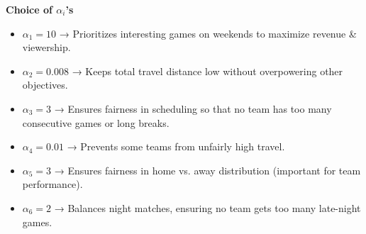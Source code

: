 \documentclass[a4paper, 12pt]{article}
\begin{document}
\vspace{15pt}
\textbf{Choice of $\alpha_i$'s}
\begin{itemize}
    \item \(\alpha_1 = 10\) → Prioritizes interesting games on weekends to maximize revenue \& viewership.
    \item \(\alpha_2 = 0.008\) → Keeps total travel distance low without overpowering other objectives.
    \item \(\alpha_3 = 3\) → Ensures fairness in scheduling so that no team has too many consecutive games or long breaks.
    \item \(\alpha_4 = 0.01\) → Prevents some teams from unfairly high travel.
    \item \(\alpha_5 = 3\) → Ensures fairness in home vs. away distribution (important for team performance).
    \item \(\alpha_6 = 2\) → Balances night matches, ensuring no team gets too many late-night games.
\end{itemize}







\end{document}
